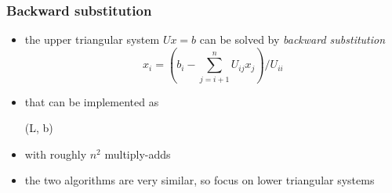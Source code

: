 \begin{frame}[fragile]
%
  \frametitle{Backward substitution}
%
  \begin{itemize}
%
%
  \item the upper triangular system $Ux = b$ can be solved by {\em backward substitution}
    \begin{equation}
      x_{i} = \left( b_{i} - \sum_{j=i+1}^{n} U_{ij}x_{j} \right) / U_{ii}
    \end{equation}
%
  \item that can be implemented as
    \begin{center}
      \begin{minipage}{.85\linewidth}
        \begin{algorithm}[H]
          \label{alg:backward-substitution}
%
          \dontprintsemicolon
          \setalcaphskip{0ex}
%
          \caption{\backsub(L, b)}
%
%
        \end{algorithm}
      \end{minipage}
    \end{center}
%
  \item with roughly $n^{2}$ multiply-adds
%
  \item the two algorithms are very similar, so focus on lower triangular systems
%
  \end{itemize}
%
\end{frame}

